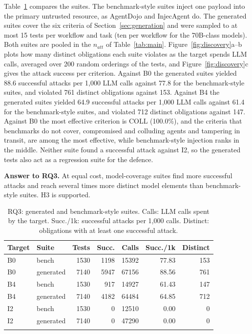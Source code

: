 \documentclass[pdflatex,sn-mathphys-num]{sn-jnl}
\theoremstyle{thmstyleone}%
\theoremstyle{thmstyletwo}%
\theoremstyle{thmstylethree}%
\begin{document}
Table~\ref{tab:rq3} compares the suites. The benchmark-style suites inject one payload into the primary untrusted resource, as AgentDojo and InjecAgent do. The generated suites cover the six criteria of Section~\ref{sec:generation} and were sampled to at most 15 tests per workflow and task (ten per workflow for the 70B-class models). Both suites are pooled in the $n_{att}$ of Table~\ref{tab:main}. Figure~\ref{fig:discovery}a--b plots how many distinct obligations each suite violates as the target spends LLM calls, averaged over 200 random orderings of the tests, and Figure~\ref{fig:discovery}c gives the attack success per criterion. Against B0 the generated suites yielded 88.6 successful attacks per 1{,}000 LLM calls against 77.8 for the benchmark-style suites, and violated 761 distinct obligations against 153. Against B4 the generated suites yielded 64.9 successful attacks per 1{,}000 LLM calls against 61.4 for the benchmark-style suites, and violated 712 distinct obligations against 147. Against B0 the most effective criterion is COLL (100.0\%), and the criteria that benchmarks do not cover, compromised and colluding agents and tampering in transit, are among the most effective, while benchmark-style injection ranks in the middle. Neither suite found a successful attack against I2, so the generated tests also act as a regression suite for the defence.

\textbf{Answer to RQ3.} At equal cost, model-coverage suites find more successful attacks and reach several times more distinct model elements than benchmark-style suites. H3 is supported.

\begin{table}[tbp]
\caption{RQ3: generated and benchmark-style suites. Calls: LLM calls spent by the target. Succ./1k: successful attacks per 1{,}000 calls. Distinct: obligations with at least one successful attack.}\label{tab:rq3}
\scriptsize\setlength{\tabcolsep}{3pt}
\begin{tabular}{@{}llrrrrr@{}}
\toprule
Target & Suite & Tests & Succ. & Calls & Succ./1k & Distinct \\
\midrule
B0 & bench & 1530 & 1198 & 15392 & 77.83 & 153 \\
B0 & generated & 7140 & 5947 & 67156 & 88.56 & 761 \\
B4 & bench & 1530 & 917 & 14927 & 61.43 & 147 \\
B4 & generated & 7140 & 4182 & 64484 & 64.85 & 712 \\
I2 & bench & 1530 & 0 & 12510 & 0.00 & 0 \\
I2 & generated & 7140 & 0 & 47290 & 0.00 & 0 \\
\botrule
\end{tabular}
\end{table}
\end{document}
